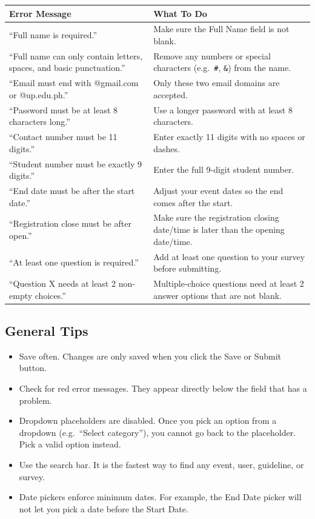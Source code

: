 \documentclass[12pt, a4paper]{article}
\begin{document}
\begin{longtable}{|>{\raggedright\arraybackslash}p{5cm}|>{\raggedright\arraybackslash}p{8cm}|}
\hline
\rowcolor{lightgray}
\textbf{Error Message} & \textbf{What To Do} \\
\hline
``Full name is required.'' & Make sure the Full Name field is not blank. \\
\hline
``Full name can only contain letters, spaces, and basic punctuation.'' & Remove any numbers or special characters (e.g.\ \texttt{\#}, \texttt{\&}) from the name. \\
\hline
``Email must end with @gmail.com or @up.edu.ph.'' & Only these two email domains are accepted. \\
\hline
``Password must be at least 8 characters long.'' & Use a longer password with at least 8 characters. \\
\hline
``Contact number must be 11 digits.'' & Enter exactly 11 digits with no spaces or dashes. \\
\hline
``Student number must be exactly 9 digits.'' & Enter the full 9-digit student number. \\
\hline
``End date must be after the start date.'' & Adjust your event dates so the end comes after the start. \\
\hline
``Registration close must be after open.'' & Make sure the registration closing date/time is later than the opening date/time. \\
\hline
``At least one question is required.'' & Add at least one question to your survey before submitting. \\
\hline
``Question X needs at least 2 non-empty choices.'' & Multiple-choice questions need at least 2 answer options that are not blank. \\
\hline
\end{longtable}

\subsection{General Tips}
\begin{itemize}[leftmargin=1.5em]
  \item Save often. Changes are only saved when you click the Save or Submit button.
  \item Check for red error messages. They appear directly below the field that has a problem.
  \item Dropdown placeholders are disabled. Once you pick an option from a dropdown (e.g.\ ``Select category''), you cannot go back to the placeholder. Pick a valid option instead.
  \item Use the search bar. It is the fastest way to find any event, user, guideline, or survey.
  \item Date pickers enforce minimum dates. For example, the End Date picker will not let you pick a date before the Start Date.
\end{itemize}
\end{document}
